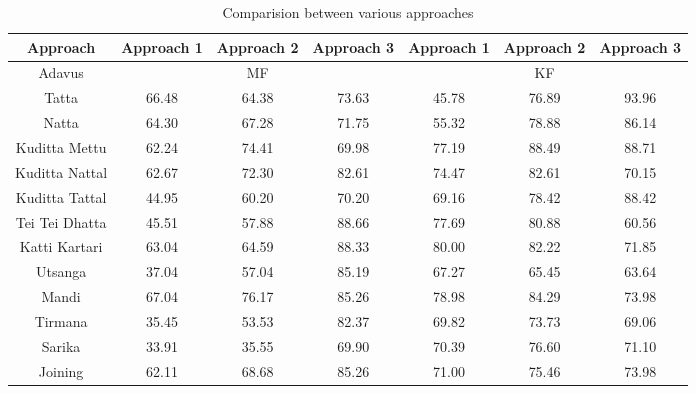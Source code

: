 \begin{table}[]
\hspace{-2.5cm}
\begin{tabular}{|c|c|c|c|c|c|c|}
\hline
Approach       & Approach 1 & Approach 2 & Approach 3 & Approach 1 & Approach 2 & Approach 3 \\ \hline
Adavus         & \multicolumn{3}{c|}{MF}              & \multicolumn{3}{c|}{KF}              \\ \hline
Tatta          & 66.48      & 64.38      & 73.63      & 45.78      & 76.89      & 93.96      \\ \hline
Natta          & 64.30      & 67.28      & 71.75      & 55.32      & 78.88      & 86.14      \\ \hline
Kuditta Mettu  & 62.24      & 74.41      & 69.98      & 77.19      & 88.49      & 88.71      \\ \hline
Kuditta Nattal & 62.67      & 72.30      & 82.61      & 74.47      & 82.61      & 70.15      \\ \hline
Kuditta Tattal & 44.95      & 60.20      & 70.20      & 69.16      & 78.42      & 88.42      \\ \hline
Tei Tei Dhatta & 45.51      & 57.88      & 88.66      & 77.69      & 80.88      & 60.56      \\ \hline
Katti Kartari  & 63.04      & 64.59      & 88.33      & 80.00      & 82.22      & 71.85      \\ \hline
Utsanga        & 37.04      & 57.04      & 85.19      & 67.27      & 65.45      & 63.64      \\ \hline
Mandi          & 67.04      & 76.17      & 85.26      & 78.98      & 84.29      & 73.98      \\ \hline
Tirmana        & 35.45      & 53.53      & 82.37      & 69.82      & 73.73      & 69.06      \\ \hline
Sarika         & 33.91      & 35.55      & 69.90      & 70.39      & 76.60      & 71.10      \\ \hline
Joining        & 62.11      & 68.68      & 85.26      & 71.00      & 75.46      & 73.98      \\ \hline
\end{tabular}
\caption{Comparision between various approaches}
\label{tab:Ch06T004}
\end{table}











